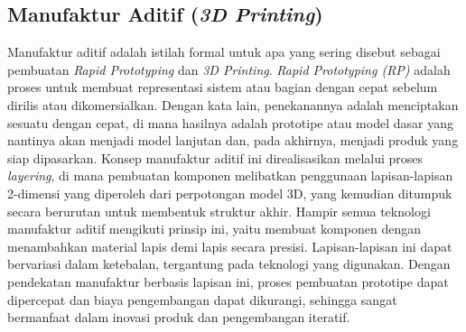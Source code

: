 \subsection{Manufaktur Aditif (\textit{3D Printing})}
Manufaktur aditif adalah istilah formal untuk apa yang sering disebut sebagai pembuatan \textit{Rapid Prototyping} dan \textit{3D Printing}. \textit{Rapid Prototyping (RP)} adalah proses untuk membuat representasi sistem atau bagian dengan cepat sebelum dirilis atau dikomersialkan. Dengan kata lain, penekanannya adalah menciptakan sesuatu dengan cepat, di mana hasilnya adalah prototipe atau model dasar yang nantinya akan menjadi model lanjutan dan, pada akhirnya, menjadi produk yang siap dipasarkan. Konsep manufaktur aditif ini direalisasikan melalui proses \textit{layering}, di mana pembuatan komponen melibatkan penggunaan lapisan-lapisan 2-dimensi yang diperoleh dari perpotongan model 3D, yang kemudian ditumpuk secara berurutan untuk membentuk struktur akhir. Hampir semua teknologi manufaktur aditif mengikuti prinsip ini, yaitu membuat komponen dengan menambahkan material lapis demi lapis secara presisi. Lapisan-lapisan ini dapat bervariasi dalam ketebalan, tergantung pada teknologi yang digunakan. Dengan pendekatan manufaktur berbasis lapisan ini, proses pembuatan prototipe dapat dipercepat dan biaya pengembangan dapat dikurangi, sehingga sangat bermanfaat dalam inovasi produk dan pengembangan iteratif.

